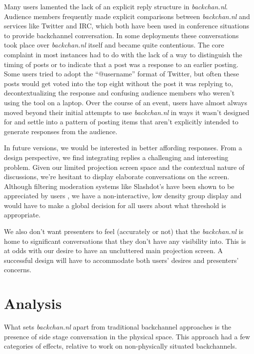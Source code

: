 Many users lamented the lack of an explicit reply structure in \emph{backchan.nl}. Audience members frequently made explicit comparisons between \emph{backchan.nl} and services like Twitter and IRC, which both have been used in conference situations to provide backchannel conversation. In some deployments these conversations took place over \emph{backchan.nl} itself and became quite contentious. The core complaint in most instances had to do with the lack of a way to distinguish the timing of posts or to indicate that a post was a response to an earlier posting. Some users tried to adopt the ``@username'' format of Twitter, but often these posts would get voted into the top eight without the post it was replying to, decontextualizing the response and confusing audience members who weren't using the tool on a laptop. Over the course of an event, users have almost always moved beyond their initial attempts to use \emph{backchan.nl} in ways it wasn't designed for and settle into a pattern of posting items that aren't explicitly intended to generate responses from the audience. 

In future versions, we would be interested in better affording responses. From a design perspective, we find integrating replies a challenging and interesting problem. Given our limited projection screen space and the contextual nature of discussions, we're hesitant to display elaborate conversations on the screen. Although filtering moderation systems like Slashdot's have been shown to be appreciated by users \citep{Ratto:2003vs}, we have a non-interactive, low density group display and would have to make a global decision for all users about what threshold is appropriate.

We also don't want presenters to feel (accurately or not) that the \emph{backchan.nl} is home to significant conversations that they don't have any visibility into. This is at odds with our desire to have an uncluttered main projection screen. A successful design will have to accommodate both users' desires and presenters' concerns.

\section{Analysis}

What sets \emph{backchan.nl} apart from traditional backchannel approaches is the presence of side stage conversation in the physical space. This approach had a few categories of effects, relative to work on non-physically situated backchannels.

